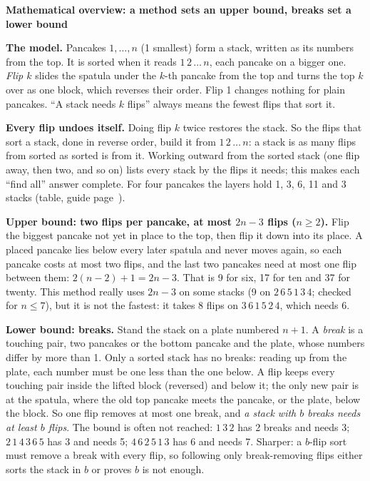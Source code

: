\documentclass[11pt]{article}
\newcommand{\head}[1]{\par\textbf{\large #1}\par}
\begin{document}
\sansmath
\head{Mathematical overview: a method sets an upper bound, breaks set a lower bound}
\textbf{The model.} Pancakes $1,\dots,n$ (1 smallest) form a stack, written as its numbers from the top. It is sorted when it reads $1\,2\,\dots\,n$, each pancake on a bigger one. \emph{Flip $k$} slides the spatula under the $k$-th pancake from the top and turns the top $k$ over as one block, which reverses their order. Flip 1 changes nothing for plain pancakes. ``A stack needs $k$ flips'' always means the fewest flips that sort it.

\textbf{Every flip undoes itself.} Doing flip $k$ twice restores the stack. So the flips that sort a stack, done in reverse order, build it from $1\,2\,\dots\,n$: a stack is as many flips from sorted as sorted is from it. Working outward from the sorted stack (one flip away, then two, and so on) lists every stack by the flips it needs; this makes each ``find all'' answer complete. For four pancakes the layers hold 1, 3, 6, 11 and 3 stacks (table, guide page~\pageref{tab:four}).

\textbf{Upper bound: two flips per pancake, at most $2n-3$ flips ($n\ge2$).} Flip the biggest pancake not yet in place to the top, then flip it down into its place. A placed pancake lies below every later spatula and never moves again, so each pancake costs at most two flips, and the last two pancakes need at most one flip between them: $2(n-2)+1=2n-3$. That is 9 for six, 17 for ten and 37 for twenty. This method really uses $2n-3$ on some stacks (9 on $2\,6\,5\,1\,3\,4$; checked for $n\le7$), but it is not the fastest: it takes 8 flips on $3\,6\,1\,5\,2\,4$, which needs 6.

\textbf{Lower bound: breaks.} Stand the stack on a plate numbered $n+1$. A \emph{break} is a touching pair, two pancakes or the bottom pancake and the plate, whose numbers differ by more than 1. Only a sorted stack has no breaks: reading up from the plate, each number must be one less than the one below. A flip keeps every touching pair inside the lifted block (reversed) and below it; the only new pair is at the spatula, where the old top pancake meets the pancake, or the plate, below the block. So one flip removes at most one break, and \emph{a stack with $b$ breaks needs at least $b$ flips}. The bound is often not reached: $1\,3\,2$ has 2 breaks and needs 3; $2\,1\,4\,3\,6\,5$ has 3 and needs 5; $4\,6\,2\,5\,1\,3$ has 6 and needs 7. Sharper: a $b$-flip sort must remove a break with every flip, so following only break-removing flips either sorts the stack in $b$ or proves $b$ is not enough.
\end{document}
